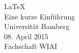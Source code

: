 \begin{center}
\Huge \LaTeX\\
\vspace{5mm} \LARGE Eine kurze Einführung\\
\vspace{12mm} \Large  Universität Bamberg\\[5mm]
\large 08. April 2015\\
Fachschaft WIAI\normalsize \\
\end{center}
